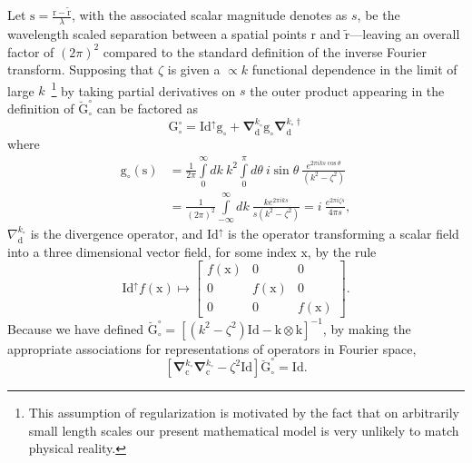 \documentclass[reprint,aps,prb]{revtex4-2}
\newcommand{\bmm}[1]{\bm{\mathrm{#1}}}
\begin{document}
\noindent
Let $\bmm{s} = \frac{\bmm{r}-\tilde{\bmm{r}}}{\lambda}$, with the associated scalar magnitude denotes as $s$, be the wavelength scaled separation between a spatial points $\bmm{r}$ and $\tilde{\bmm{r}}$---leaving an overall factor of $\left(2\pi\right)^{2}$ compared to the standard definition of the inverse Fourier transform. 
Supposing that $\zeta$ is given a $\propto k$ functional dependence in the limit of large $k$~\footnote{This assumption of regularization is motivated by the fact that on arbitrarily small length scales our present mathematical model is very unlikely to match physical reality.} by taking partial derivatives on $s$ the outer product appearing in the definition of $\breve{\bmm{G}}^{\circ}_{\circ}$ can be factored as 
\begin{equation}
	\bmm{G}^{\circ}_{\circ} = \bmm{Id}^{\uparrow} \bmm{g}_{\circ} + \bm{\nabla}_{\bmm{d}}^{k_{\circ}}\bmm{g}_{\circ} \bm{\nabla}_{\bmm{d}}^{k_{\circ}\dagger}
\end{equation}
where 
\begin{align} 
	\bmm{g}_{\circ}\left(\bmm{s}\right) &= 
	\frac{1}{2\pi}\int\limits_{0}^{\infty}dk~k^{2}\int\limits_{0}^{\pi}d\theta~i\sin\theta~\frac{e^{2\pi ik s\cos\theta }}{\left(k^{2}-\zeta^{2}\right)}
	\label{gScal}\\
	&=\frac{1}{\left(2\pi\right)^{2}}\int\limits_{-\infty}^{\infty}dk~\frac{k e^{2\pi iks}}{s\left(k^{2} -\zeta^{2}\right)}
	 = i~\frac{e^{2 \pi i\zeta s}}{4\pi s},
	\nonumber
\end{align}
$\nabla_{\bmm{d}}^{k_{\circ}}$ is the divergence operator, and $\bmm{Id}^{\uparrow}$ is the operator transforming a scalar field into a three dimensional vector field, for some index $\bmm{x}$, by the rule 
\begin{equation}
	\bmm{Id}^{\uparrow}f\left(\bmm{x}\right) \mapsto 
	\begin{bmatrix}
		f\left(\bmm{x}\right) & 0 & 0 \\
		0 & f\left(\bmm{x}\right) & 0 \\
		0 & 0 & f\left(\bmm{x}\right)
	\end{bmatrix}.
\end{equation}
Because we have defined $\breve{\bmm{G}}^{\circ}_{\circ} = \left[\left(k^{2} - \zeta^{2}\right)\bmm{Id} - \bmm{k}\otimes \bmm{k}\right]^{-1}$, by making the appropriate associations for representations of operators in Fourier space, 
\begin{equation}
	\left[\bm{\nabla}_{\bmm{c}}^{k_{\circ}}\bm{\nabla}_{\bmm{c}}^{k_{\circ}}-\zeta^{2}\bmm{Id}\right] 
	\breve{\bmm{G}}^{\circ}_{\circ} = \bmm{Id}. 
\end{equation}
\end{document}
